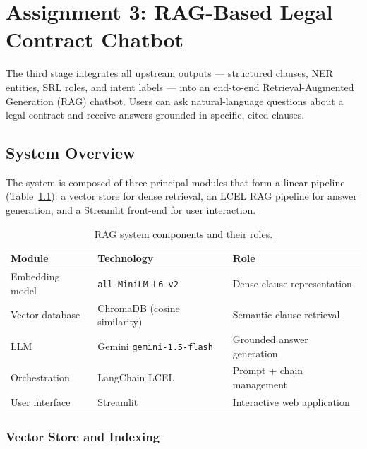 \documentclass[assignment.tex]{subfiles}
\begin{document}
\chapter{Assignment 3: RAG-Based Legal Contract Chatbot}
\label{sec:assignment3}

The third stage integrates all upstream outputs — structured clauses, NER entities,
SRL roles, and intent labels — into an end-to-end Retrieval-Augmented Generation
(RAG) chatbot.  Users can ask natural-language questions about a legal contract and
receive answers grounded in specific, cited clauses.

\section{System Overview}
\label{subsec:rag-overview}

The system is composed of three principal modules that form a linear pipeline
(Table~\ref{tab:rag-components}): a vector store for dense retrieval, an LCEL
RAG pipeline for answer generation, and a Streamlit front-end for user interaction.

\begin{table}[H]
    \centering
    \caption{RAG system components and their roles.}
    \label{tab:rag-components}
    \begin{tabular}{@{}lll@{}}
        \toprule
        \textbf{Module} & \textbf{Technology} & \textbf{Role} \\
        \midrule
        Embedding model  & \texttt{all-MiniLM-L6-v2}          & Dense clause representation \\
        Vector database  & ChromaDB (cosine similarity)        & Semantic clause retrieval \\
        LLM              & Gemini \texttt{gemini-1.5-flash}    & Grounded answer generation \\
        Orchestration    & LangChain LCEL                      & Prompt + chain management \\
        User interface   & Streamlit                           & Interactive web application \\
        \bottomrule
    \end{tabular}
\end{table}

\subsection{Vector Store and Indexing}
\label{subsec:vector-store}
\end{document}
